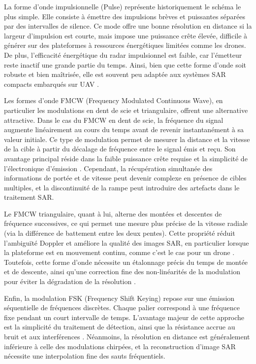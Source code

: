 La forme d’onde impulsionnelle (Pulse) représente historiquement le schéma le plus simple. Elle consiste à émettre des impulsions brèves et puissantes séparées par des intervalles de silence. Ce mode offre une bonne résolution en distance si la largeur d’impulsion est courte, mais impose une puissance crête élevée, difficile à générer sur des plateformes à ressources énergétiques limitées comme les drones. De plus, l’efficacité énergétique du radar impulsionnel est faible, car l’émetteur reste inactif une grande partie du temps. Ainsi, bien que cette forme d’onde soit robuste et bien maîtrisée, elle est souvent peu adaptée aux systèmes SAR compacts embarqués sur UAV \cite{skolnik2008radar}.

Les formes d’onde FMCW (Frequency Modulated Continuous Wave), en particulier les modulations en dent de scie et triangulaire, offrent une alternative attractive. Dans le cas du FMCW en dent de scie, la fréquence du signal augmente linéairement au cours du temps avant de revenir instantanément à sa valeur initiale. Ce type de modulation permet de mesurer la distance et la vitesse de la cible à partir du décalage de fréquence entre le signal émis et reçu. Son avantage principal réside dans la faible puissance crête requise et la simplicité de l’électronique d’émission \cite{ma2016compact}. Cependant, la récupération simultanée des informations de portée et de vitesse peut devenir complexe en présence de cibles multiples, et la discontinuité de la rampe peut introduire des artefacts dans le traitement SAR.

Le FMCW triangulaire, quant à lui, alterne des montées et descentes de fréquence successives, ce qui permet une mesure plus précise de la vitesse radiale (via la différence de battement entre les deux pentes). Cette propriété réduit l’ambiguïté Doppler et améliore la qualité des images SAR, en particulier lorsque la plateforme est en mouvement continu, comme c’est le cas pour un drone \cite{meta2007performance}. Toutefois, cette forme d’onde nécessite un étalonnage précis du temps de montée et de descente, ainsi qu’une correction fine des non-linéarités de la modulation pour éviter la dégradation de la résolution \cite{aoki2020chirp}.

Enfin, la modulation FSK (Frequency Shift Keying) repose sur une émission séquentielle de fréquences discrètes. Chaque palier correspond à une fréquence fixe pendant un court intervalle de temps. L’avantage majeur de cette approche est la simplicité du traitement de détection, ainsi que la résistance accrue au bruit et aux interférences \cite{li2018fsk}. Néanmoins, la résolution en distance est généralement inférieure à celle des modulations chirpées, et la reconstruction d’image SAR nécessite une interpolation fine des sauts fréquentiels.

